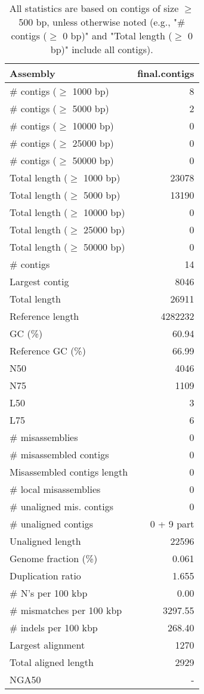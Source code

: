 \documentclass[12pt,a4paper]{article}
\begin{document}
\begin{table}[ht]
\begin{center}
\caption{All statistics are based on contigs of size $\geq$ 500 bp, unless otherwise noted (e.g., "\# contigs ($\geq$ 0 bp)" and "Total length ($\geq$ 0 bp)" include all contigs).}
\begin{tabular}{|l*{1}{|r}|}
\hline
Assembly & final.contigs \\ \hline
\# contigs ($\geq$ 1000 bp) & 8 \\ \hline
\# contigs ($\geq$ 5000 bp) & 2 \\ \hline
\# contigs ($\geq$ 10000 bp) & 0 \\ \hline
\# contigs ($\geq$ 25000 bp) & 0 \\ \hline
\# contigs ($\geq$ 50000 bp) & 0 \\ \hline
Total length ($\geq$ 1000 bp) & 23078 \\ \hline
Total length ($\geq$ 5000 bp) & 13190 \\ \hline
Total length ($\geq$ 10000 bp) & 0 \\ \hline
Total length ($\geq$ 25000 bp) & 0 \\ \hline
Total length ($\geq$ 50000 bp) & 0 \\ \hline
\# contigs & 14 \\ \hline
Largest contig & 8046 \\ \hline
Total length & 26911 \\ \hline
Reference length & 4282232 \\ \hline
GC (\%) & 60.94 \\ \hline
Reference GC (\%) & 66.99 \\ \hline
N50 & 4046 \\ \hline
N75 & 1109 \\ \hline
L50 & 3 \\ \hline
L75 & 6 \\ \hline
\# misassemblies & 0 \\ \hline
\# misassembled contigs & 0 \\ \hline
Misassembled contigs length & 0 \\ \hline
\# local misassemblies & 0 \\ \hline
\# unaligned mis. contigs & 0 \\ \hline
\# unaligned contigs & 0 + 9 part \\ \hline
Unaligned length & 22596 \\ \hline
Genome fraction (\%) & 0.061 \\ \hline
Duplication ratio & 1.655 \\ \hline
\# N's per 100 kbp & 0.00 \\ \hline
\# mismatches per 100 kbp & 3297.55 \\ \hline
\# indels per 100 kbp & 268.40 \\ \hline
Largest alignment & 1270 \\ \hline
Total aligned length & 2929 \\ \hline
NGA50 & - \\ \hline
\end{tabular}
\end{center}
\end{table}
\end{document}

